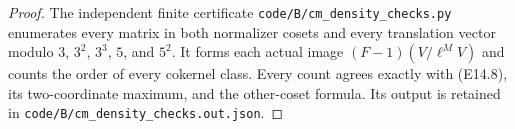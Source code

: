 \begin{proof}
The independent finite certificate
\texttt{code/B/cm\_density\_checks.py} enumerates every matrix
in both normalizer cosets and every translation vector modulo
$3$, $3^2$, $3^3$, $5$, and $5^2$.  It forms each actual image
$(F-1)(V/\ell^M V)$ and counts the order of every cokernel
class.  Every count agrees exactly with (E14.8), its
two-coordinate maximum, and the other-coset formula.  Its
output is retained in
\texttt{code/B/cm\_density\_checks.out.json}.
\end{proof}
